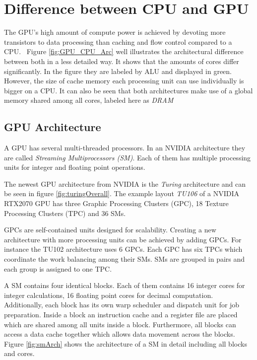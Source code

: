 \section{Difference between CPU and GPU} 
  The GPU's high amount of compute power is achieved by devoting more transistors to data processing than caching and flow control compared to a CPU.~\cite{NVIDIA.2019}
  Figure \ref{fig:GPU_CPU_Arc} well illustrates the architectural difference between both in a less detailed way.
  It shows that the amounts of cores differ significantly.
  In the figure they are labeled by ALU and displayed in green.
  However, the size of cache memory each processing unit can use individually is bigger on a CPU.
  It can also be seen that both architectures make use of a global memory shared among all cores, labeled here as \textit{DRAM}
  
  
\subsection{GPU Architecture}
\label{subsec:GPU_Arc}
  A GPU has several multi-threaded processors.
  In an NVIDIA architecture they are called \textit{Streaming Multiprocessors (SM)}.
  Each of them has multiple processing units for integer and floating point operations.~\cite{Rauber.2012}

  The newest GPU architecture from NVIDIA is the \textit{Turing} architecture and can be seen in figure \ref{fig:turingOverall}.
  The example layout \textit{TU106} of a NVIDIA RTX2070 GPU has three Graphic Processing Clusters (GPC), 18 Texture Processing Clusters (TPC) and 36 SMs.~\cite{NVIDIA.2018}
  	  
  GPCs are self-contained units designed for scalability.
  Creating a new architecture with more processing units can be achieved by adding GPCs.
  For instance the TU102 architecture uses 6 GPCs.
  Each GPC has six TPCs which coordinate the work balancing among their SMs.
  SMs are grouped in pairs and each group is assigned to one TPC.~\cite{Lindholm.2008}~\cite{NVIDIA.2018}
    
  A SM contains four identical blocks.
  Each of them contains 16 integer cores for integer calculations, 16 floating point cores for decimal computation. %
  Additionally, each block has its own warp scheduler and dispatch unit for job preparation.
  Inside a block an instruction cache and a register file are placed which are shared among all units inside a block.
  Furthermore, all blocks can access a data cache together which allows data movement across the blocks.
  Figure \ref{fig:smArch} shows the architecture of a SM in detail including all blocks and cores.~\cite{Burgess.2020}~\cite{NVIDIA.2018}

